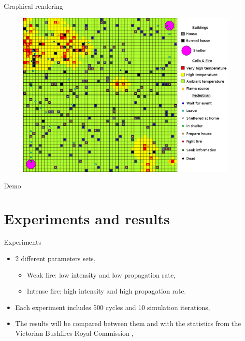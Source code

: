 \documentclass{beamer}
\begin{document}
    \begin{frame}{Graphical rendering}
      \vspace{-1em}
      \begin{figure}[h]
        \includegraphics[scale=0.35]{simu-legends.png}
      \end{figure}
    \end{frame}

    \begin{frame}{Demo}
      \begin{figure}
        \vspace{-1.8em}
        \hspace*{-2em}
       \end{figure}
    \end{frame}

  \section{Experiments and results}

    \begin{frame}{Experiments}
      \begin{itemize}
        \item 2 different parameters sets,
				\begin{itemize}
					\item Weak fire: low intensity and low propagation rate,
					\item Intense fire: high intensity and high propagation rate.
				\end{itemize}
        \item Each experiment includes 500 cycles and 10 simulation iterations,
        \item The results will be compared between them and with the statistics from the Victorian Bushfires Royal Commission \cite{stats2009},
      \end{itemize}
    \end{frame}
\end{document}

